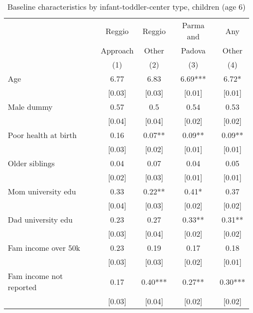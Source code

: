 \begin{table}[H]
\caption{Baseline characteristics by infant-toddler-center type, children (age 6)}
\label{tab:child_CONTROLasilo}
\centering
\small
\begin{tabular}{l cccc}
\hline \hline 
 & Reggio & Reggio & Parma and & Any \\
 & Approach & Other & Padova & Other \\
 &   (1)    &  (2)  & (3)    &  (4) \\
\hline 

Age & 6.77 & 6.83 & 6.69*** & 6.72* \\
 & [0.03] & [0.03] & [0.01] & [0.01] \\
Male dummy & 0.57 & 0.5 & 0.54 & 0.53 \\
 & [0.04] & [0.04] & [0.02] & [0.02] \\
Poor health at birth & 0.16 & 0.07** & 0.09** & 0.09** \\
 & [0.03] & [0.02] & [0.01] & [0.01] \\
Older siblings  & 0.04 & 0.07 & 0.04 & 0.05 \\
 & [0.02] & [0.03] & [0.01] & [0.01] \\
Mom university edu  & 0.33 & 0.22** & 0.41* & 0.37 \\
 & [0.04] & [0.03] & [0.02] & [0.02] \\
Dad university edu  & 0.23 & 0.27 & 0.33** & 0.31** \\
 & [0.03] & [0.04] & [0.02] & [0.02] \\
Fam income over 50k  & 0.23 & 0.19 & 0.17 & 0.18 \\
 & [0.03] & [0.03] & [0.02] & [0.01] \\
Fam income not reported  & 0.17 & 0.40*** & 0.27** & 0.30*** \\
 & [0.03] & [0.04] & [0.02] & [0.02] \\

\end{tabular}
\end{table}
